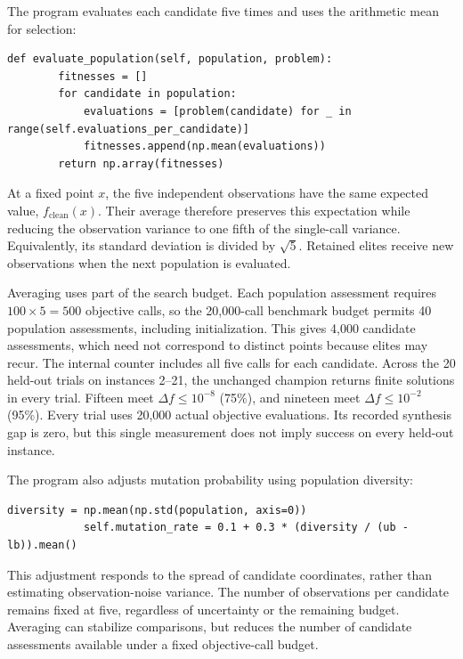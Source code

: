 The program evaluates each candidate five times and uses the
arithmetic mean for selection:
\begin{lstlisting}[style=championprogram,firstnumber=70,basicstyle=\ttfamily\footnotesize]
    def evaluate_population(self, population, problem):
        fitnesses = []
        for candidate in population:
            evaluations = [problem(candidate) for _ in range(self.evaluations_per_candidate)]
            fitnesses.append(np.mean(evaluations))
        return np.array(fitnesses)
\end{lstlisting}
At a fixed point $x$, the five independent observations have the
same expected value, $f_{\mathrm{clean}}(x)$. Their average therefore
preserves this expectation while reducing the observation variance
to one fifth of the single-call variance. Equivalently, its standard
deviation is divided by $\sqrt{5}$. Retained elites receive new
observations when the next population is evaluated.

Averaging uses part of the search budget. Each population assessment
requires $100\times5=500$ objective calls, so the 20,000-call
benchmark budget permits 40 population assessments, including
initialization. This gives 4,000 candidate assessments, which need
not correspond to distinct points because elites may recur.
The internal counter includes all five calls for each candidate.
Across the 20 held-out trials on instances 2--21, the unchanged
champion returns finite solutions in every trial. Fifteen meet
$\Delta f\leq10^{-8}$ (75\%), and nineteen meet
$\Delta f\leq10^{-2}$ (95\%). Every trial uses 20,000 actual
objective evaluations. Its recorded synthesis gap is zero, but
this single measurement does not imply success on every held-out
instance.

The program also adjusts mutation probability using population
diversity:
\begin{lstlisting}[style=championprogram,firstnumber=65,basicstyle=\ttfamily\footnotesize]
            diversity = np.mean(np.std(population, axis=0))
            self.mutation_rate = 0.1 + 0.3 * (diversity / (ub - lb)).mean()
\end{lstlisting}
This adjustment responds to the spread of candidate coordinates,
rather than estimating observation-noise variance. The number of
observations per candidate remains fixed at five, regardless of
uncertainty or the remaining budget. Averaging can stabilize
comparisons, but reduces the number of candidate assessments
available under a fixed objective-call budget.

